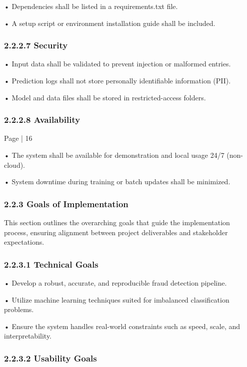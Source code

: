 \documentclass[11pt,a4paper]{article}
\begin{document}
• 
Dependencies shall be listed in a requirements.txt file. 

• 
A setup script or environment installation guide shall be included. 

\subsubsection*{2.2.2.7 Security }

• 
Input data shall be validated to prevent injection or malformed entries. 

• 
Prediction logs shall not store personally identifiable information (PII). 

• 
Model and data files shall be stored in restricted-access folders. 

\subsubsection*{2.2.2.8 Availability }

Page | 16  

\newpage

• 
The system shall be available for demonstration and local usage 24/7 (non-cloud). 

• 
System downtime during training or batch updates shall be minimized. 

\subsubsection*{2.2.3 Goals of Implementation }

This section outlines the overarching goals that guide the implementation process, ensuring alignment 
between project deliverables and stakeholder expectations. 

\subsubsection*{2.2.3.1 Technical Goals }

• 
Develop a robust, accurate, and reproducible fraud detection pipeline. 

• 
Utilize machine learning techniques suited for imbalanced classification problems. 

• 
Ensure the system handles real-world constraints such as speed, scale, and interpretability. 

\subsubsection*{2.2.3.2 Usability Goals }
\end{document}
